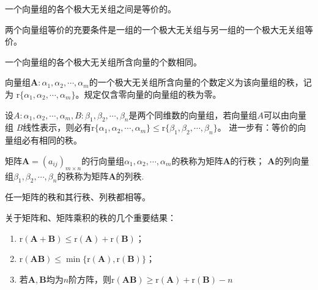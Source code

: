 \begin{theorem}
    一个向量组的各个极大无关组之间是等价的。
\end{theorem}

\begin{theorem}
    两个向量组等价的充要条件是一组的一个极大无关组与另一组的一个极大无关组等价。
\end{theorem}

\begin{theorem}
    一个向量组的各个极大无关组所含向量的个数相同。
\end{theorem}

\begin{definition}[向量组的秩]
    向量组$\boldsymbol{A}:\alpha_1,\alpha_2,\cdots,\alpha_m$的一个极大无关组所含向量的个数定义为该{\heiti 向量组的秩}，记为
    $\mathrm{r}\{\alpha_1,\alpha_2,\cdots,\alpha_m\}$。规定仅含零向量的向量组的秩为零。
\end{definition}

\begin{definition}
    设$A:\alpha_1,\alpha_2,\cdots,\alpha_m,B:\beta_1,\beta_2,\cdots,\beta_n$是两个同维数的向量组，若向量组$A$可以由向量组
    $B$线性表示，则必有$\mathrm{r}\{\alpha_1,\alpha_2,\cdots,\alpha_m\}\leq \mathrm{r}\{\beta_1,\beta_2,\cdots,\beta_n\}$。
    进一步有：等价的向量组必有相同的秩。
\end{definition}

\begin{definition}
    矩阵$\boldsymbol{A}={(a_{ij})}_{m\times n}$的行向量组$\alpha_1,\alpha_2,\cdots,\alpha_m$的秩称为矩阵$\boldsymbol{A}$的{\heiti 行秩}；
    $\boldsymbol{A}$的列向量组$\beta_1,\beta_2,\cdots,\beta_n$的秩称为矩阵$\boldsymbol{A}$的{\heiti 列秩}.
\end{definition}

\begin{theorem}
    任一矩阵的秩和其行秩、列秩都相等。
\end{theorem}

\begin{theorem}
    关于矩阵和、矩阵乘积的秩的几个重要结果：
    \begin{enumerate}[(1)]
        \item $\mathrm{r}(\boldsymbol{A}+\boldsymbol{B})\leq \mathrm{r}(\boldsymbol{A})+\mathrm{r}(\boldsymbol{B})$；
        \item $\mathrm{r}(\boldsymbol{A}\boldsymbol{B})\leq \min\{\mathrm{r}(\boldsymbol{A}),\mathrm{r}(\boldsymbol{B})\}$；
        \item 若$\boldsymbol{A},\boldsymbol{B}$均为$n$阶方阵，则$\mathrm{r}(\boldsymbol{A}\boldsymbol{B})\geq \mathrm{r}(\boldsymbol{A})+\mathrm{r}(\boldsymbol{B})-n$
    \end{enumerate}
\end{theorem}